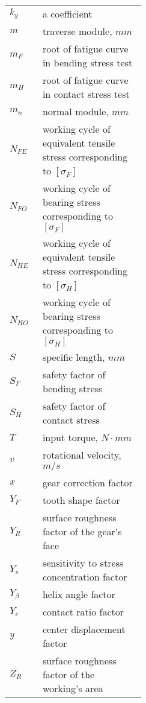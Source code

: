 \noindent\begin{tabular}[t]{p{0.05\linewidth}p{0.4\linewidth}}
	$ k_y $ & a coefficient\\
	$ m $ & traverse module, $ \unit{mm} $\\
	$ m_F $ & root of fatigue curve in bending stress test\\
	$ m_H $ & root of fatigue curve in contact stress test\\
	$ m_n $ & normal module, $ \unit{mm} $\\
	$ N_{FE} $ & working cycle of equivalent tensile stress corresponding to $ [\sigma_F] $\\
	$ N_{FO} $ & working cycle of bearing stress corresponding to $ [\sigma_F] $\\
	$ N_{HE} $ & working cycle of equivalent tensile stress corresponding to $ [\sigma_H] $\\
	$ N_{HO} $ & working cycle of bearing stress corresponding to $ [\sigma_H] $\\
	$ S $ & specific length, $ \unit{mm} $\\
	$ S_F $ & safety factor of bending stress\\
	$ S_H $ & safety factor of contact stress\\
	$ T $ & input torque, $ \unit{N\cdot mm} $\\
	$ v $ & rotational velocity, $ \unit{m/s} $\\
	$ x $ & gear correction factor\\
	$ Y_F $ & tooth shape factor\\
	$ Y_R $ & surface roughness factor of the gear's face\\
	$ Y_s $ & sensitivity to stress concentration factor\\
	$ Y_\beta $ & helix angle factor\\
	$ Y_\varepsilon $ & contact ratio factor\\
	$ y $ & center displacement factor\\
	$ Z_R $ & surface roughness factor of the working's area\\
\end{tabular}
